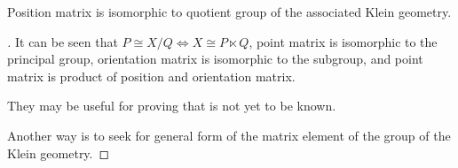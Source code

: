 \documentclass[stu, babel, american, biblatex, a4paper, leqno, draftall]{apa7}
\begin{document}
\begin{lemma}\label{M:Position:Group}
    Position matrix is isomorphic to quotient group of the associated Klein geometry.
\end{lemma}
\begin{proof}[]
    \skipped

    It can be seen that $P\cong X/Q \iff X \cong P \ltimes Q$,
    point matrix is isomorphic to the principal group,
    orientation matrix is isomorphic to the subgroup,
    and point matrix is product of position and orientation matrix.

    They may be useful for proving that is not yet to be known.

    Another way is to seek for general form of the matrix element of the group of the Klein geometry.
\end{proof}
\end{document}
